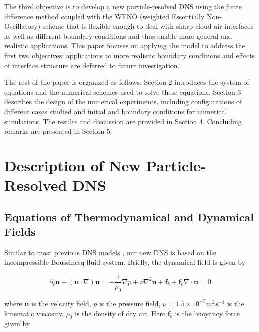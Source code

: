 \documentclass[draft,linenumbers]{agujournal}
\begin{document}
{The third objective is to develop a new particle-resolved DNS using the finite difference method coupled with the WENO (weighted Essentially Non-Oscillatory) scheme \citep{JiangShu1996} that is flexible enough to deal with sharp cloud-air interfaces as well as different boundary conditions and thus enable more general and realistic applications. This paper focuses on applying the model to address the first two objectives; applications to more realistic boundary conditions and effects of interface structure are deferred to future investigation.}

The rest of the paper is organized as follows. Section 2 introduces the system of equations and the numerical schemes used to solve these equations. Section 3 describes the design of the numerical experiments, including configurations of different cases studied and initial and boundary conditions for numerical simulations. The results and discussion are provided in Section 4. Concluding remarks are presented in Section 5. 

\section{Description of New Particle-Resolved DNS}\label{particle_dns}

\subsection{Equations of Thermodynamical and Dynamical Fields}

Similar to most previous DNS models \citep[e.g.,][]{And04}, our new DNS is based on the incompressible Boussinesq fluid system. Briefly, the dynamical field is given by

\begin{subequations}

\begin{equation}
\partial_{t}\mathbf{u}+(\mathbf{u}\cdot\nabla)\mathbf{u}=-\frac{1}{\rho_{0}}\nabla p+\nu\nabla^2 \mathbf{u}+\mathbf{f}_b + \mathbf{f}_e\label{eq:NS1}
\end{equation}


\begin{equation}
\nabla\cdot \mathbf{u}=0\label{eq:NS2}
\end{equation}

\end{subequations}

where $\mathbf{u}$ is the velocity field, $p$ is the pressure field, $\nu = 1.5\times 10^{-5}m^2s^{-1}$ is the {kinematic} viscosity, $\rho_{0}$ is the density of dry air. Here $\mathbf{f}_b$ is the buoyancy force given by 
\end{document}

